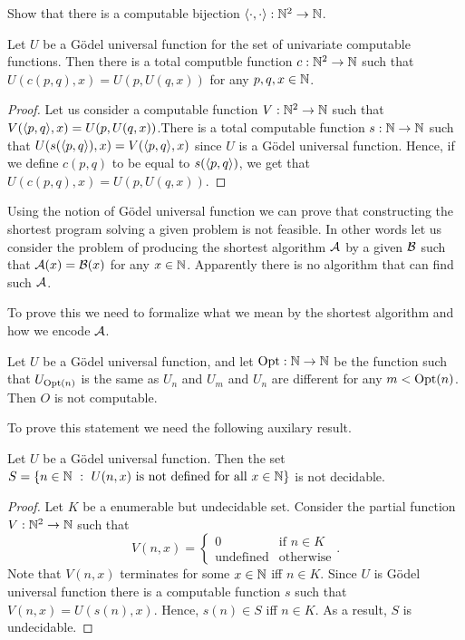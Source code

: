 \begin{exercise}
  Show that there is a computable bijection $\langle {\cdot}, {\cdot} \rangle : {\mathbb{N}}^2 \to {\mathbb{N}}$.
\end{exercise}

\begin{theorem}
  Let $U$ be a G\"odel universal function for the set of univariate computable
  functions. Then there is a total computble function $c : {\mathbb{N}}^2 \to {\mathbb{N}}$ such
  that $U(c(p, q), x) = U(p, U(q, x))$ for any $p, q, x \in {\mathbb{N}}$.
\end{theorem}
\begin{proof}
  Let us consider a computable function $V : {\mathbb{N}}^2 \to {\mathbb{N}}$ such that
  $V(\langle {p}, {q} \rangle, x) = U(p, U(q, x))$.There is a total computable function $s :
  {\mathbb{N}} \to {\mathbb{N}}$ such that $U(s(\langle {p}, {q} \rangle), x) = V(\langle {p}, {q} \rangle, x)$ since $U$ is a
  G\"odel universal function. Hence, if we define $c(p, q)$ to be equal to
  $s(\langle {p}, {q} \rangle)$, we get that $U(c(p, q), x) = U(p, U(q, x))$.
\end{proof}

Using the notion of G\"odel universal function we can prove that constructing
the shortest program solving a given problem is not feasible.
In other words let us consider the problem of producing the shortest algorithm
$\mathcal{A}$ by a given $\mathcal{B}$ such that
$\mathcal{A}(x) = \mathcal{B}(x)$ for any $x \in {\mathbb{N}}$. Apparently there is
no algorithm that can find such $\mathcal{A}$.

To prove this we need to formalize what we mean by the shortest algorithm and
how we encode $\mathcal{A}$.
\begin{theorem}
\label{theorem:program-optimization}
  Let $U$ be a G\"odel universal function, and let $\mathrm{Opt} : {\mathbb{N}} \to {\mathbb{N}}$ be
  the function such that $U_{\mathrm{Opt}(n)}$ is the same as $U_n$ and $U_m$ and
  $U_n$ are different for any $m < \mathrm{Opt}(n)$. Then $O$ is not computable.
\end{theorem}

To prove this statement we need the following auxilary result.
\begin{theorem}
  Let $U$ be a G\"odel universal function. 
  Then the set 
  $S = \set[U(n, x) \text{ is not defined for all } x \in \N]{n \in \N}$ is
  not decidable.
\end{theorem}
\begin{proof}
  Let $K$ be a enumerable but undecidable set.
  Consider the partial function $V : {\mathbb{N}}^2 \to {\mathbb{N}}$ such that 
  \[
    V(n, x) = 
    \begin{cases}
      0 & \text{if } n \in K \\
      \text{undefined} & \text{otherwise}
    \end{cases}.
  \]
  Note that $V(n, x)$ terminates for some $x \in {\mathbb{N}}$ iff $n \in K$. 
  Since $U$ is G\"odel universal function there is a computable function $s$
  such that $V(n, x) = U(s(n), x)$. Hence, $s(n) \in S$ iff $n \in K$.
  As a result, $S$ is undecidable.
\end{proof}

